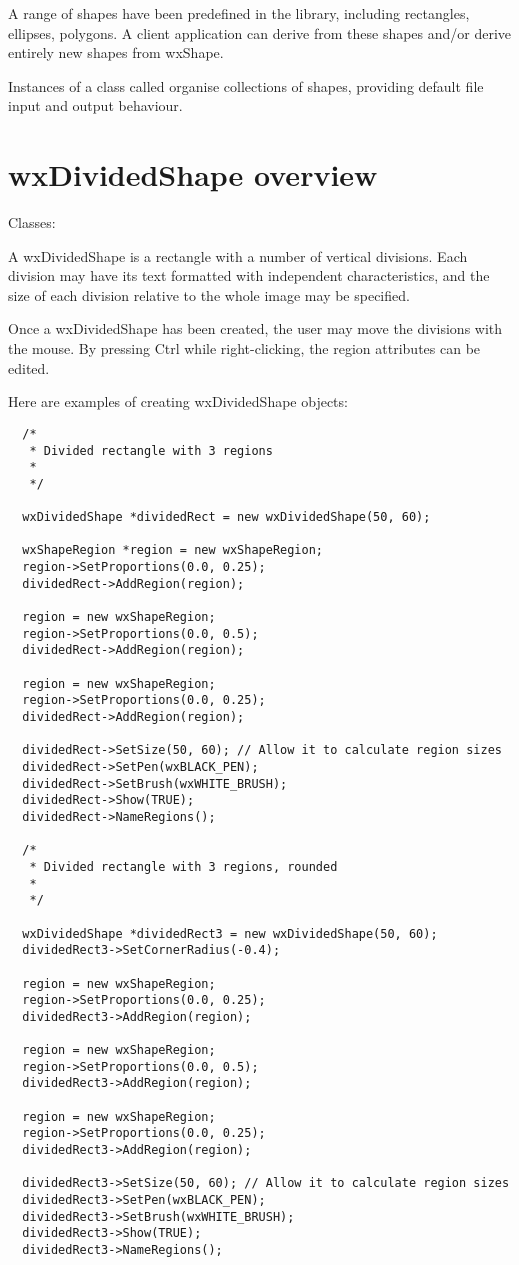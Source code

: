 A range of shapes have been predefined in the library, including rectangles, ellipses,
polygons. A client application can derive from these shapes and/or derive entirely
new shapes from wxShape.

Instances of a class called  organise collections of
shapes, providing default file input and output behaviour.

\section{wxDividedShape overview}\label{dividedshapeoverview}

Classes: 

A wxDividedShape is a rectangle with a number of vertical divisions. Each
division may have its text formatted with independent characteristics, and
the size of each division relative to the whole image may be specified.

Once a wxDividedShape has been created, the user may move the divisions with the
mouse. By pressing Ctrl while right-clicking, the region attributes can be edited.

Here are examples of creating wxDividedShape objects:

{\small
\begin{verbatim}
  /*
   * Divided rectangle with 3 regions
   *
   */

  wxDividedShape *dividedRect = new wxDividedShape(50, 60);

  wxShapeRegion *region = new wxShapeRegion;
  region->SetProportions(0.0, 0.25);
  dividedRect->AddRegion(region);

  region = new wxShapeRegion;
  region->SetProportions(0.0, 0.5);
  dividedRect->AddRegion(region);

  region = new wxShapeRegion;
  region->SetProportions(0.0, 0.25);
  dividedRect->AddRegion(region);
  
  dividedRect->SetSize(50, 60); // Allow it to calculate region sizes
  dividedRect->SetPen(wxBLACK_PEN);
  dividedRect->SetBrush(wxWHITE_BRUSH);
  dividedRect->Show(TRUE);
  dividedRect->NameRegions();

  /*
   * Divided rectangle with 3 regions, rounded
   *
   */

  wxDividedShape *dividedRect3 = new wxDividedShape(50, 60);
  dividedRect3->SetCornerRadius(-0.4);

  region = new wxShapeRegion;
  region->SetProportions(0.0, 0.25);
  dividedRect3->AddRegion(region);

  region = new wxShapeRegion;
  region->SetProportions(0.0, 0.5);
  dividedRect3->AddRegion(region);

  region = new wxShapeRegion;
  region->SetProportions(0.0, 0.25);
  dividedRect3->AddRegion(region);
  
  dividedRect3->SetSize(50, 60); // Allow it to calculate region sizes
  dividedRect3->SetPen(wxBLACK_PEN);
  dividedRect3->SetBrush(wxWHITE_BRUSH);
  dividedRect3->Show(TRUE);
  dividedRect3->NameRegions();
\end{verbatim}
}

